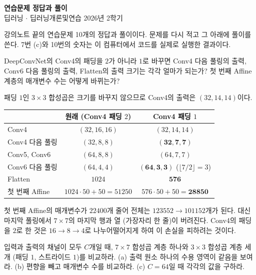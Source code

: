 \documentclass[11pt,a4paper]{article}
\begin{document}
\begin{center}
{\LARGE\bfseries 연습문제 정답과 풀이}\\[0.35em]
{\large 딥러닝 $\cdot$ 딥러닝개론및연습 2026년 2학기}
\end{center}

강의노트 끝의 연습문제 10개의 정답과 풀이이다. 문제를 다시 적고 그 아래에 풀이를 쓴다.
7번 (c)와 10번의 숫자는 이 컴퓨터에서 코드를 실제로 실행한 결과이다.

\begin{problems}

\item DeepConvNet의 Conv4의 패딩을 $2$가 아니라 $1$로 바꾸면 Conv4 다음 풀링의 출력, Conv6 다음 풀링의 출력,
Flatten의 출력 크기는 각각 얼마가 되는가? 첫 번째 Affine 계층의 매개변수 수는 어떻게 바뀌는가?

\begin{sol}
패딩 $1$인 $3\times3$ 합성곱은 크기를 바꾸지 않으므로 Conv4의 출력은 $(32,14,14)$이다.
\begin{center}
\begin{tabular}{lcc}
\toprule
 & 원래 (Conv4 패딩 $2$) & Conv4 패딩 $1$ \\
\midrule
Conv4 & $(32,16,16)$ & $(32,14,14)$ \\
Conv4 다음 풀링 & $(32,8,8)$ & $\mathbf{(32,7,7)}$ \\
Conv5, Conv6 & $(64,8,8)$ & $(64,7,7)$ \\
Conv6 다음 풀링 & $(64,4,4)$ & $\mathbf{(64,3,3)}$ ($\lfloor7/2\rfloor=3$) \\
Flatten & $1024$ & $\mathbf{576}$ \\
첫 번째 Affine & $1024\cdot50+50=51250$ & $576\cdot50+50=\mathbf{28850}$ \\
\bottomrule
\end{tabular}
\end{center}
첫 번째 Affine의 매개변수가 $22400$개 줄어 전체는 $123552\to101152$개가 된다.
대신 마지막 풀링에서 $7\times7$의 마지막 행과 열 (가장자리 한 줄)이 버려진다.
Conv4의 패딩을 $2$로 한 것은 $16\to8\to4$로 나누어떨어지게 하여 이 손실을 피하려는 것이다.
\end{sol}

\item 입력과 출력의 채널이 모두 $C$개일 때, $7\times7$ 합성곱 계층 하나와 $3\times3$ 합성곱 계층 세 개 (패딩 $1$, 스트라이드 $1$)를 비교하라.
(a) 출력 원소 하나의 수용 영역이 같음을 보여라. (b) 편향을 빼고 매개변수 수를 비교하라. (c) $C=64$일 때 각각의 값을 구하라.


\end{problems}
\end{document}
